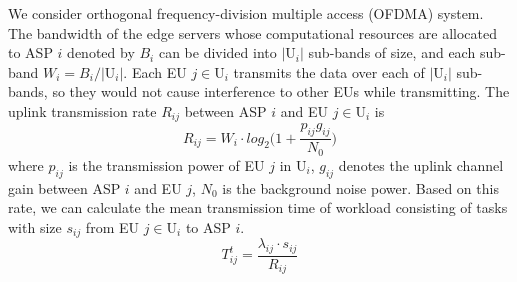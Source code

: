 \documentclass[10pt,journal, compsoc]{IEEEtran}
\begin{document}
We consider orthogonal frequency-division multiple access (OFDMA) system. The bandwidth of the edge servers whose computational resources are allocated to ASP $i$ denoted by $B_i$ can be divided into $|\mathrm{U}_i|$ sub-bands of size, and each sub-band $W_{i} = B_i/|\mathrm{U}_i|$. Each EU $j\in \mathrm{U}_i$ transmits the data over each of $|\mathrm{U}_i|$ sub-bands, so they would not cause interference to other EUs while transmitting. The uplink transmission rate $R_{ij}$ between ASP $i$ and EU $j \in \mathrm{U}_i$ is
\begin{equation} \label{eqn:shannon}
R_{ij}=W_i \cdot log_2\Big(1+\frac{p_{ij}g_{ij}}{N_{0}}\Big)
\end{equation}
where $p_{ij}$ is the transmission power of EU $j$ in $\mathrm{U}_i$, $g_{ij}$ denotes the uplink channel gain between ASP $i$ and EU $j$, $N_0$ is the background noise power. Based on this rate, we can calculate the mean transmission time of workload consisting of tasks with size $s_{ij}$ from EU $j \in \mathrm{U}_i$ to ASP $i$.
\begin{equation}
T_{ij}^t=\frac{\lambda_{ij} \cdot s_{ij}}{R_{ij}}
\end{equation}
\end{document}
